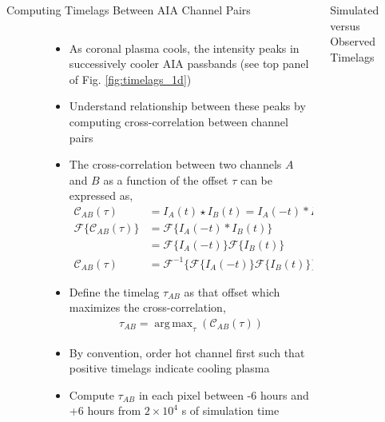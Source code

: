 \documentclass[final,12pt]{beamer}
\DeclareMathOperator*{\argmax}{arg\,max} %
\begin{document}
\begin{frame}
\begin{columns}[T]
\begin{column}{0.49\linewidth}
\begin{block}{Computing Timelags Between AIA Channel Pairs}
\begin{columns}[c]
\begin{column}{0.53\columnwidth}
\begin{figure}
          \end{figure}
        \end{column}
        \begin{column}{0.45\columnwidth}
          \begin{itemize}
            \item As coronal plasma cools, the intensity peaks in successively cooler AIA passbands (see top panel of Fig. \ref{fig:timelags_1d})
            \item Understand relationship between these peaks by computing cross-correlation between channel pairs
            \item The cross-correlation between two channels $A$ and $B$ as a function of the offset $\tau$ can be expressed as,
            \begin{align*}
              \mathcal{C}_{AB}(\tau) &= I_A(t)\star I_B(t) = I_A(-t)*I_B(t),\\
              \mathcal{F}\{\mathcal{C}_{AB}(\tau)\} &= \mathcal{F}\{I_A(-t)*I_B(t)\} \\
              &= \mathcal{F}\{I_A(-t)\}\mathcal{F}\{I_B(t)\} \\
              \mathcal{C}_{AB}(\tau) &= \mathcal{F}^{-1}\{\mathcal{F}\{I_A(-t)\}\mathcal{F}\{I_B(t)\}\}
            \end{align*}
            \item Define the timelag $\tau_{AB}$ as that offset which maximizes the cross-correlation,
            \begin{align*}
              \tau_{AB} = \argmax_{\tau}(\mathcal{C}_{AB}(\tau))
            \end{align*}
            \item By convention, order hot channel first such that \alert{positive timelags indicate cooling plasma}
            \item Compute $\tau_{AB}$ in each pixel between -6 hours and +6 hours from $2\times10^4$ s of simulation time
          \end{itemize}
        \end{column}
      \end{columns}
    \end{block}
  \end{column}
  \begin{column}{0.49\linewidth}
    \begin{block}{Simulated versus Observed Timelags}

\end{block}
\end{column}
\end{columns}
\end{frame}
\end{document}
